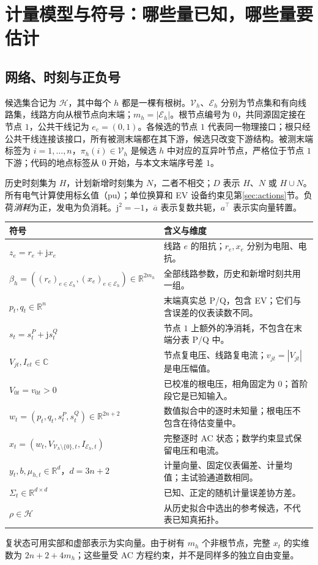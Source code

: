 \documentclass[UTF8,fontset=fandol,11pt,a4paper]{ctexart}
\newcommand{\R}{\mathbb R}
\newcommand{\HH}{\mathcal H}
\begin{document}
\section{计量模型与符号：哪些量已知，哪些量要估计}
\label{sec:model}
\subsection{网络、时刻与正负号}
候选集合记为 $\HH$，其中每个 $h$ 都是一棵有根树。$\mathcal V_h$、$\mathcal E_h$ 分别为节点集和有向线路集，线路方向从根节点向末端；$m_h=|\mathcal E_h|$。根节点编号为 $0$，共同源固定接在节点 $1$，公共干线记为 $e_{\mathrm c}=(0,1)$。各候选的节点 $1$ 代表同一物理接口；根只经公共干线连接该接口，所有被测末端都在其下游，候选只改变下游结构。被测末端标签为 $i=1,\ldots,n$，$\pi_h(i)\in\mathcal V_h$ 是候选 $h$ 中对应的互异叶节点，严格位于节点 $1$ 下游；代码的地点标签从 $0$ 开始，与本文末端序号差 $1$。

历史时刻集为 $H$，计划新增时刻集为 $N$，二者不相交；$D$ 表示 $H$、$N$ 或 $H\cup N$。所有电气计算使用标幺值（pu）；单位换算和 EV 设备约束见第\ref{sec:actions}节。负荷\emph{消耗}为正，发电为负消耗。$\mathrm j^2=-1$，$\overline a$ 表示复数共轭，$a^\top$ 表示实向量转置。

\begin{longtable}{L{.25\textwidth}L{.65\textwidth}}
\toprule
符号 & 含义与维度\\\midrule\endhead
$z_e=r_e+\mathrm jx_e$ & 线路 $e$ 的阻抗；$r_e,x_e$ 分别为电阻、电抗。\\
$\beta_h=((r_e)_{e\in\mathcal E_h},(x_e)_{e\in\mathcal E_h})\in\R^{2m_h}$ & 全部线路参数，历史和新增时刻共用一组。\\
$p_t,q_t\in\R^n$ & 末端真实总 P/Q，包含 EV；它们与含误差的仪表读数不同。\\
$s_t=s_t^P+\mathrm js_t^Q$ & 节点 $1$ 上额外的净消耗，不包含在末端分表 P/Q 中。\\
$V_{jt},I_{et}\in\mathbb C$ & 节点复电压、线路复电流；$v_{jt}=|V_{jt}|$ 是电压幅值。\\
$V_{0t}=v_{0t}>0$ & 已校准的根电压，相角固定为 $0$；首阶段它是已知输入。\\
$w_t=(p_t,q_t,s_t^P,s_t^Q)\in\R^{2n+2}$ & 数值拟合中的逐时未知量；根电压不包含在待估变量中。\\
$x_t=(w_t,V_{\mathcal V_h\setminus\{0\},t},I_{\mathcal E_h,t})$ & 完整逐时 AC 状态；数学约束显式保留电压和电流。\\
$y_t,b,\mu_{h,t}\in\R^{d}$，$d=3n+2$ & 计量向量、固定仪表偏差、计量均值；主试验通道数相同。\\
$\Sigma_t\in\R^{d\times d}$ & 已知、正定的随机计量误差协方差。\\
$\rho\in\HH$ & 从历史拟合中选出的参考候选，不代表已知真拓扑。\\
\bottomrule
\end{longtable}
复状态可用实部和虚部表示为实向量。由于树有 $m_h$ 个非根节点，完整 $x_t$ 的实维数为 $2n+2+4m_h$；这些量受 AC 方程约束，并不是同样多的独立自由变量。
\end{document}
